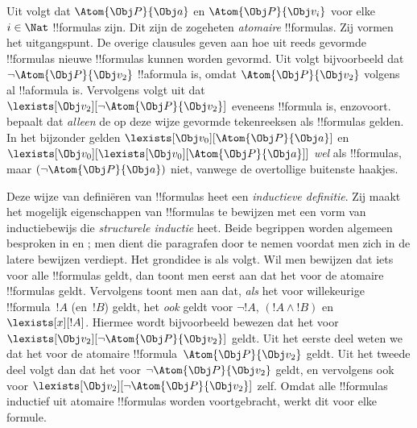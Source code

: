 \documentclass[openany]{memoir}
\begin{document}
Uit  volgt dat $\Atom{\Obj P}{\Obj a}$ en
$\Atom{\Obj P}{\Obj v_i}$ voor elke $i \in \Nat$ !!{formula}s zijn.
Dit zijn de zogeheten \emph{atomaire} !!{formula}s. Zij vormen het
uitgangspunt. De overige clausules geven aan hoe uit reeds gevormde
!!{formula}s nieuwe !!{formula}s kunnen worden gevormd. Uit
 volgt bijvoorbeeld dat $\lnot \Atom{\Obj P}{\Obj v_2}$
!!a{formula} is, omdat $\Atom{\Obj P}{\Obj v_2}$ volgens
 al !!a{formula} is. Vervolgens volgt uit
 dat $\lexists[\Obj v_2][\lnot \Atom{\Obj P}{\Obj
v_2}]$ eveneens !!{formula} is, enzovoort.  bepaalt
dat \emph{alleen} de op deze wijze gevormde tekenreeksen als
!!{formula}s gelden. In het bijzonder gelden $\lexists[\Obj
v_0][\Atom{\Obj P}{\Obj a}]$ en $\lexists[\Obj v_0][\lexists[\Obj
v_0][\Atom{\Obj P}{\Obj a}]]$ \emph{wel} als !!{formula}s, maar
$(\lnot \Atom{\Obj P}{\Obj a})$ niet, vanwege de overtollige buitenste
haakjes.

Deze wijze van definiëren van !!{formula}s heet een \emph{inductieve
definitie}. Zij maakt het mogelijk eigenschappen van !!{formula}s te
bewijzen met een vorm van inductiebewijs die \emph{structurele inductie}
heet. Beide begrippen worden algemeen besproken in
 en ; men dient die
paragrafen door te nemen voordat men zich in de latere bewijzen
verdiept. Het grondidee is als volgt. Wil men bewijzen dat iets voor
alle !!{formula}s geldt, dan toont men eerst aan dat het voor de
atomaire !!{formula}s geldt. Vervolgens toont men aan dat, \emph{als}
het voor willekeurige !!{formula}~$!A$ (en~$!B$) geldt, het \emph{ook}
geldt voor $\lnot !A$, $(!A \land !B)$ en $\lexists[x][!A]$. Hiermee
wordt bijvoorbeeld bewezen dat het voor $\lexists[\Obj v_2][\lnot
\Atom{\Obj P}{\Obj v_2}]$ geldt. Uit het eerste deel weten we dat het
voor de atomaire !!{formula}~$\Atom{\Obj P}{\Obj v_2}$ geldt. Uit het
tweede deel volgt dan dat het voor $\lnot \Atom{\Obj P}{\Obj v_2}$
geldt, en vervolgens ook voor $\lexists[\Obj v_2][\lnot \Atom{\Obj
P}{\Obj v_2}]$ zelf. Omdat alle !!{formula}s inductief uit atomaire
!!{formula}s worden voortgebracht, werkt dit voor elke formule.
\endgroup

\begingroup
\def\olfilename{OLP-0143}
\def\olfilepath{content/first-order-logic/introduction/}
\hypertarget{unit-OLP-0143}{}
\end{document}
